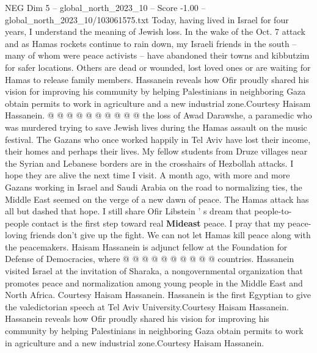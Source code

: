 \begin{textsample}{NEG Dim 5 – global\_north\_2023\_10 – Score -1.00 – global\_north\_2023\_10/103061575.txt}
Today, having lived in Israel for four years, I understand the meaning of Jewish loss.
In the wake of the Oct. 7 attack and as Hamas rockets continue to rain down, my Israeli friends in the south -- many of whom were peace activists -- have abandoned their towns and kibbutzim for safer locations.
Others are dead or wounded, lost loved ones or are waiting for Hamas to release family members.
Hassanein reveals how Ofir proudly shared his vision for improving his community by helping Palestinians in neighboring Gaza obtain permits to work in agriculture and a new industrial zone.Courtesy Haisam Hassanein. @ @ @ @ @ @ @ @ @ @ the loss of Awad Darawshe, a paramedic who was murdered trying to save Jewish lives during the Hamas assault on the music festival.
The Gazans who once worked happily in Tel Aviv have lost their income, their homes and perhaps their lives.
My fellow students from Druze villages near the Syrian and Lebanese borders are in the crosshairs of Hezbollah attacks.
I hope they are alive the next time I visit.
A month ago, with more and more Gazans working in Israel and Saudi Arabia on the road to normalizing ties, the Middle East seemed on the verge of a new dawn of peace.
The Hamas attack has all but dashed that hope.
I still share Ofir Libstein ' s dream that people-to-people contact is the first step toward real \textbf{Mideast} peace.
I pray that my peace-loving friends don't give up the fight.
We can not let Hamas kill peace along with the peacemakers.
Haisam Hassanein is adjunct fellow at the Foundation for Defense of Democracies, where @ @ @ @ @ @ @ @ @ @ countries.
Hassanein visited Israel at the invitation of Sharaka, a nongovernmental organization that promotes peace and normalization among young people in the Middle East and North Africa.
Courtesy Haisam Hassanein.
Hassanein is the first Egyptian to give the valedictorian speech at Tel Aviv University.Courtesy Haisam Hassanein.
Hassanein reveals how Ofir proudly shared his vision for improving his community by helping Palestinians in neighboring Gaza obtain permits to work in agriculture and a new industrial zone.Courtesy Haisam Hassanein.

\end{textsample}
